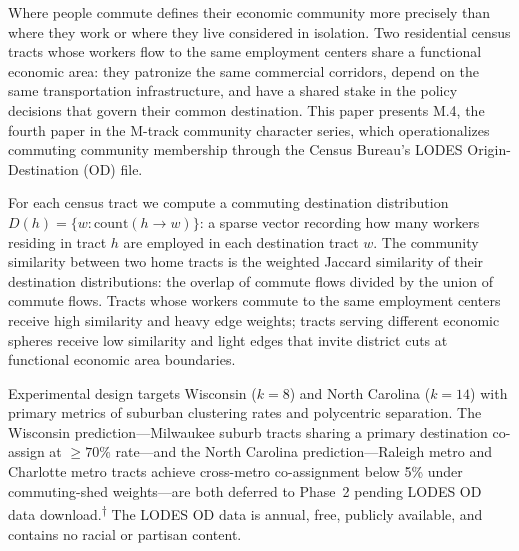 Where people commute defines their economic community more precisely than
where they work or where they live considered in isolation.
Two residential census tracts whose workers flow to the same employment
centers share a functional economic area: they patronize the same
commercial corridors, depend on the same transportation infrastructure,
and have a shared stake in the policy decisions that govern their common
destination.
This paper presents M.4, the fourth paper in the M-track community character
series, which operationalizes commuting community membership through the
Census Bureau's LODES Origin-Destination (OD) file.

For each census tract we compute a commuting destination distribution
$D(h) = \{w : \mathrm{count}(h \to w)\}$: a sparse vector recording how many
workers residing in tract $h$ are employed in each destination tract $w$.
The community similarity between two home tracts is the weighted Jaccard
similarity of their destination distributions: the overlap of commute flows
divided by the union of commute flows.
Tracts whose workers commute to the same employment centers receive high
similarity and heavy edge weights; tracts serving different economic spheres
receive low similarity and light edges that invite district cuts at functional
economic area boundaries.

Experimental design targets Wisconsin ($k=8$) and North Carolina ($k=14$)
with primary metrics of suburban clustering rates and polycentric separation.
The Wisconsin prediction---Milwaukee suburb tracts sharing a primary
destination co-assign at ${\geq}70\%$ rate---and the North Carolina
prediction---Raleigh metro and Charlotte metro tracts achieve cross-metro
co-assignment below 5\% under commuting-shed weights---are both deferred
to Phase~2 pending LODES OD data download.\textsuperscript{$\dagger$}
The LODES OD data is annual, free, publicly available, and contains no
racial or partisan content.
